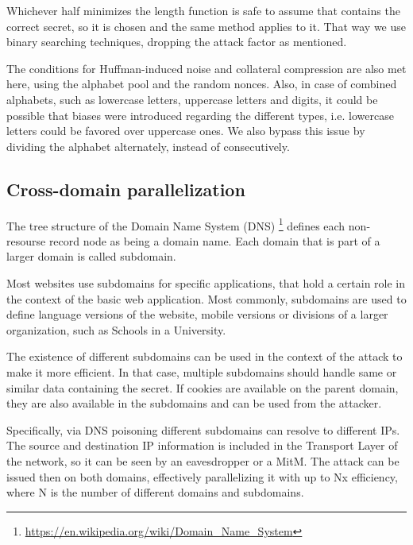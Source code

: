 Whichever half minimizes the length function is safe to assume that contains the
correct secret, so it is chosen and the same method applies to it. That way we
use binary searching techniques, dropping the attack factor as mentioned.

The conditions for Huffman-induced noise and collateral compression are also met
here, using the alphabet pool and the random nonces. Also, in case of combined
alphabets, such as lowercase letters, uppercase letters and digits, it could be
possible that biases were introduced regarding the different types, i.e.
lowercase letters could be favored over uppercase ones. We also bypass this issue
by dividing the alphabet alternately, instead of consecutively.

\subsection{Cross-domain parallelization}

The tree structure of the Domain Name System (DNS)
\footnote{\url{https://en.wikipedia.org/wiki/Domain_Name_System}} defines each
non-resourse record node as being a domain name. Each domain that is part of a
larger domain is called subdomain.

Most websites use subdomains for specific applications, that hold a certain role
in the context of the basic web application. Most commonly, subdomains are used
to define language versions of the website, mobile versions or divisions of a
larger organization, such as Schools in a University.

The existence of different subdomains can be used in the context of the attack
to make it more efficient. In that case, multiple subdomains should handle same
or similar data containing the secret. If cookies are available on the parent
domain, they are also available in the subdomains and can be used from the
attacker.

Specifically, via DNS poisoning different subdomains can resolve to different
IPs. The source and destination IP information is included in the Transport
Layer of the network, so it can be seen by an eavesdropper or a MitM. The
attack can be issued then on both domains, effectively parallelizing it with up
to Nx efficiency, where N is the number of different domains and subdomains.
